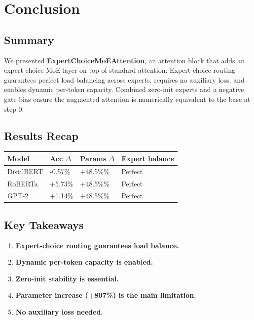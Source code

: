 \section{Conclusion}

\subsection{Summary}

We presented \textbf{ExpertChoiceMoEAttention}, an attention block that adds an 
expert-choice MoE layer on top of standard attention. Expert-choice routing 
guarantees perfect load balancing across experts, requires no auxiliary 
loss, and enables dynamic per-token capacity. Combined zero-init experts 
and a negative gate bias ensure the augmented attention is numerically 
equivalent to the base at step 0.

\subsection{Results Recap}

\begin{table}[H]
\centering
\small
\begin{tabular}{llll}
\toprule
\textbf{Model} & \textbf{Acc $\Delta$} & \textbf{Params $\Delta$} & \textbf{Expert balance} \\
\midrule
DistilBERT & -0.57\% & +48.5\%\% & Perfect \\
RoBERTa & +5.73\% & +48.5\%\% & Perfect \\
GPT-2 & +1.14\% & +48.5\%\% & Perfect \\
\bottomrule
\end{tabular}
\end{table}

\subsection{Key Takeaways}

\begin{enumerate}
\item \textbf{Expert-choice routing guarantees load balance.}
\item \textbf{Dynamic per-token capacity is enabled.}
\item \textbf{Zero-init stability is essential.}
\item \textbf{Parameter increase (+807\%) is the main limitation.}
\item \textbf{No auxiliary loss needed.}

\end{enumerate}
